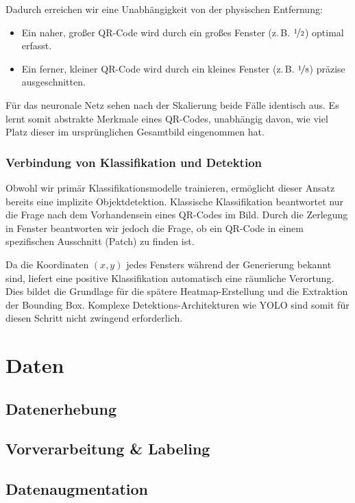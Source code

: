 \documentclass[
    a4paper,        %
    11pt,           %
    ngerman,        %
    parskip=half,   %
    listof=totoc,   %
    bibliography=totoc %
]{scrartcl}
\begin{document}
Dadurch erreichen wir eine Unabhängigkeit von der physischen Entfernung:
\begin{itemize}
    \item Ein naher, großer QR-Code wird durch ein großes Fenster (z.\,B. $\nicefrac{1}{2}$) optimal erfasst.
    \item Ein ferner, kleiner QR-Code wird durch ein kleines Fenster (z.\,B. $\nicefrac{1}{8}$) präzise ausgeschnitten.
\end{itemize}
Für das neuronale Netz sehen nach der Skalierung beide Fälle identisch aus. Es lernt somit abstrakte Merkmale eines QR-Codes, unabhängig davon, wie viel Platz dieser im ursprünglichen Gesamtbild eingenommen hat.

\subsubsection{Verbindung von Klassifikation und Detektion}
Obwohl wir primär Klassifikationsmodelle trainieren, ermöglicht dieser Ansatz bereits eine implizite Objektdetektion. Klassische Klassifikation beantwortet nur die Frage nach dem Vorhandensein eines QR-Codes im Bild. Durch die Zerlegung in Fenster beantworten wir jedoch die Frage, ob ein QR-Code in einem spezifischen Ausschnitt (Patch) zu finden ist.

Da die Koordinaten $(x, y)$ jedes Fensters während der Generierung bekannt sind, liefert eine positive Klassifikation automatisch eine räumliche Verortung. Dies bildet die Grundlage für die spätere Heatmap-Erstellung und die Extraktion der Bounding Box. Komplexe Detektions-Architekturen wie YOLO sind somit für diesen Schritt nicht zwingend erforderlich.

\section{Daten}

\subsection{Datenerhebung}

\subsection{Vorverarbeitung \& Labeling}

\subsection{Datenaugmentation}
\end{document}
